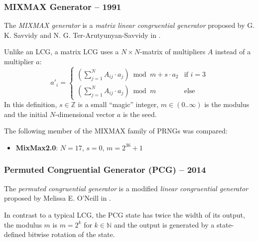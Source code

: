 \subsubsection[MIXMAX Generator -- 1991]{MIXMAX Generator -- 1991} \label{subsubsec:mixmax}

    The \emph{MIXMAX generator} is a \emph{matrix linear congruential generator} proposed by G. K. Savvidy and N. G. Ter-Arutyunyan-Savvidy in \cite{Savvidy:1991}.

    Unlike an LCG, a matrix LCG uses a $N{\times}N$-matrix of multipliers $A$ instead of a multiplier $a$:
    \begin{equation*}
        a'_i = \begin{cases}
                   \left(\sum_{j = 1}^{N} A_{ij} \cdot a_j\right) \bmod m + s \cdot a_2 & \text{if } i = 3 \\
                   \left(\sum_{j = 1}^{N} A_{ij} \cdot a_j\right) \bmod m               & \text{else}
               \end{cases}
    \end{equation*}
    In this definition, $s \in \mathbb{Z}$ is a small ``magic'' integer, $m \in \left(0.. \infty\right)$ is the modulus and the initial $N$-dimensional vector $a$ is the seed.

    The following member of the MIXMAX family of PRNGs was compared:
    \begin{itemize}
		\itemsep0em
        \item \textbf{MixMax2.0}: $N = 17$, $s = 0$, $m = 2^{36} + 1$
    \end{itemize}

\subsubsection[Permuted Congruential Generator (PCG) -- 2014]{Permuted Congruential Generator (PCG) -- 2014} \label{subsubsec:pcg}

    The \emph{permuted congruential generator} is a modified \emph{linear congruential generator} proposed by Melissa E. O'Neill in \cite{ONeill:2014}.

    In contrast to a typical LCG, the PCG state has twice the width of its output, the modulus $m$ is $m = 2^k$ for $k \in \mathbb{N}$ and the output is generated by a state-defined bitwise rotation of the state.

